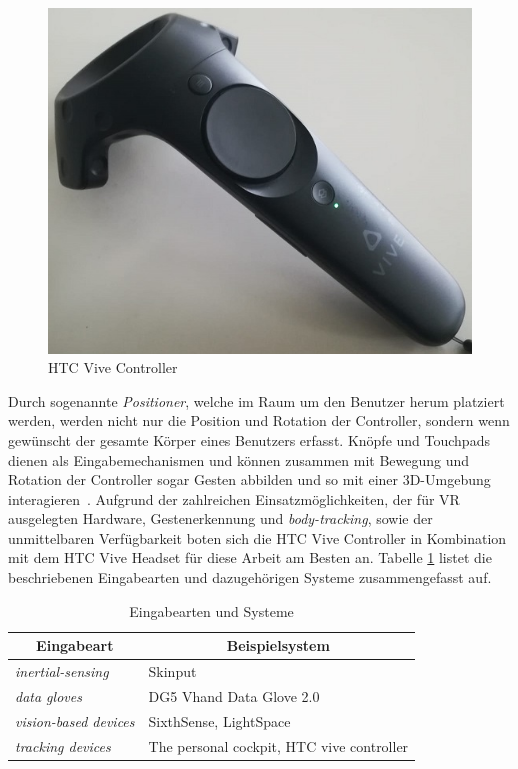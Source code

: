 \begin{figure}[h]
\captionsetup{width=.7\linewidth}
\includegraphics[scale=0.75]{Bilder/Hauptteil/vivecontroller}
\centering
\caption{HTC Vive Controller}
\label{fig:vivecontroller}
\end{figure}

Durch sogenannte \textit{Positioner}, welche im Raum um den Benutzer herum platziert werden, werden nicht nur die Position und Rotation der Controller, sondern wenn gewünscht der gesamte Körper eines Benutzers erfasst. Knöpfe und Touchpads dienen als Eingabemechanismen und können zusammen mit Bewegung und Rotation der Controller sogar Gesten abbilden und so mit einer 3D-Umgebung interagieren~\cite{wearablehtcvive}. Aufgrund der zahlreichen Einsatzmöglichkeiten, der für VR ausgelegten Hardware, Gestenerkennung und \textit{body-tracking}, sowie der unmittelbaren Verfügbarkeit boten sich die HTC Vive Controller in Kombination mit dem HTC Vive Headset für diese Arbeit am Besten an. Tabelle \ref{tab:eingabesysteme} listet die beschriebenen Eingabearten und dazugehörigen Systeme zusammengefasst auf.

\begin{table}[h]
\begin{center}
	\begin{tabular}{| l | l |}
	\hline
		\multicolumn{1}{|c|}{\textbf{Eingabeart}} & \multicolumn{1}{|c|}{\textbf{Beispielsystem}} \\[0.3cm] \hline
		\textit{inertial-sensing} & Skinput \\ \hline
		\textit{data gloves} & DG5 Vhand Data Glove 2.0 \\ \hline
		\textit{vision-based devices} & SixthSense, LightSpace \\ \hline
		\textit{tracking devices} & The personal cockpit, HTC vive controller \\ \hline
	\end{tabular}
	\caption{Eingabearten und Systeme}
	\label{tab:eingabesysteme}
\end{center}
\end{table}

